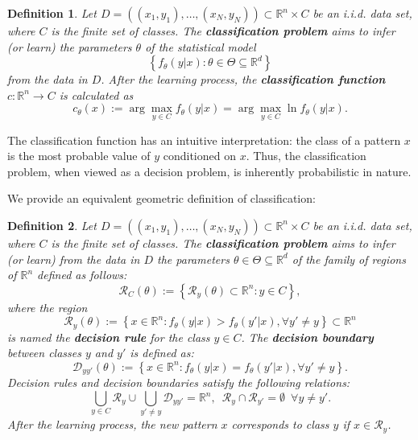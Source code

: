 \documentclass{report}
\newtheorem{definition}{Definition}[chapter]
\begin{document}
\begin{definition}
Let $D = ((x_1,y_1),\dots,(x_N,y_N)) \subset \mathbb{R}^n\times C$ be an i.i.d. data set, where $C$ is the finite set of classes. The \textbf{classification problem} aims to infer (or learn) the parameters $\theta$ of the statistical model 
\begin{equation}
\left\{f_\theta(y|x) : \theta \in \Theta \subseteq \mathbb{R}^d\right\}
\end{equation}
from the data in $D$. After the learning process, the \textbf{classification function} $c : \mathbb{R}^n \to C$ is calculated as
\begin{equation}
 c_\theta(x) := \arg\max_{y\in C}f_\theta(y|x) = \arg\max_{y\in C}\ln f_\theta(y|x).
\end{equation}
\end{definition}

The classification function has an intuitive interpretation: the class of a pattern $x$ is the most probable value of $y$ conditioned on $x$. Thus, the classification problem, when viewed as a decision problem, is inherently probabilistic in nature.

We provide an equivalent geometric definition of classification:

\begin{definition}
Let $D = ((x_1,y_1),\dots,(x_N,y_N)) \subset \mathbb{R}^n\times C$ be an i.i.d. data set, where $C$ is the finite set of classes. The \textbf{classification problem} aims to infer (or learn) from the data in $D$ the parameters $\theta \in \Theta \subseteq \mathbb{R}^d$ of the family of regions of $\mathbb{R}^n$ defined as follows: 
\begin{equation}
\mathcal{R}_C(\theta) := \left\{\mathcal{R}_y(\theta) \subset \mathbb{R}^n : y \in C\right\},
\end{equation}
where the region
\begin{equation}
\mathcal{R}_y(\theta) := \left\{x \in \mathbb{R}^n : f_\theta(y|x) > f_\theta(y'|x), \forall y' \neq y\right\} \subset \mathbb{R}^n
\end{equation}
is named the \textbf{decision rule} for the class $y \in C$. The \textbf{decision boundary} between classes $y$ and $y'$ is defined as:
\begin{equation}
\mathcal{D}_{yy'}(\theta) :=\left\{x \in \mathbb{R}^n : f_\theta(y|x) = f_\theta(y'|x), \forall y' \neq y \right\}.
\end{equation}
Decision rules and decision boundaries satisfy the following relations:
\begin{equation}
\bigcup_{y\in C}\mathcal{R}_y \cup \bigcup_{y'\neq y}\mathcal{D}_{yy'} = \mathbb{R}^n,\,\,\,\mathcal{R}_y\cap\mathcal{R}_{y'} = \emptyset\,\,\,\forall y \neq y'.
\end{equation}
After the learning process, the new pattern $x$ corresponds to class $y$ if $x \in \mathcal{R}_y$.
\end{definition}
\end{document}
